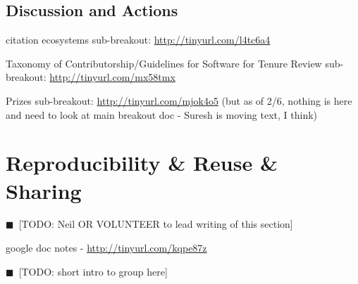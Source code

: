 \documentclass[11pt, oneside]{amsart}
\newcommand{\todo}[1]{{\color{blue}$\blacksquare$~\textsf{[TODO: #1]}}}
\begin{document}
\subsection{Discussion and Actions}
citation ecosystems sub-breakout: \url{http://tinyurl.com/l4tc6a4}

Taxonomy of Contributorship/Guidelines for Software for Tenure Review
sub-breakout: \url{http://tinyurl.com/mx58tmx}

Prizes sub-breakout: \url{http://tinyurl.com/mjok4o5}
(but as of 2/6, nothing is here and need to look at main breakout doc - Suresh
is moving text, I think)

\section{Reproducibility \& Reuse \& Sharing}
\todo{Neil OR VOLUNTEER to lead writing of this section}

google doc notes - \url{http://tinyurl.com/kqpe87z}

\todo{short intro to group here}

\end{document}

